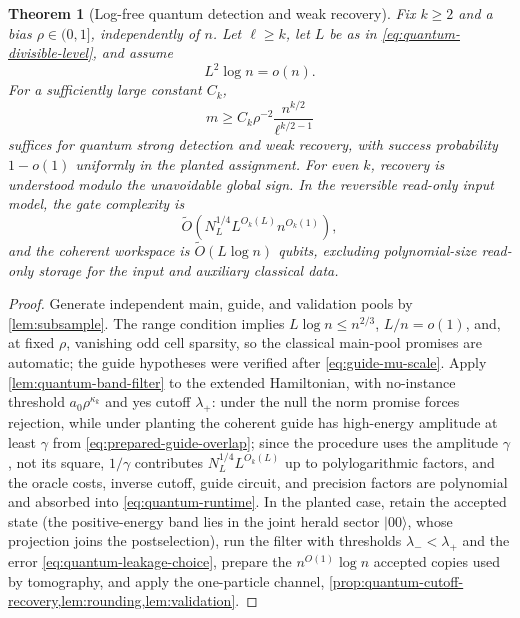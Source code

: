 \documentclass[11pt]{article}
\newtheorem{theorem}{Theorem}[section]
\theoremstyle{definition}
\theoremstyle{remark}
\newcommand{\1}{\mathbf 1}
\numberwithin{equation}{section}
\begin{document}
\begin{theorem}[Log-free quantum detection and weak recovery]
\label{thm:quantum-inference}
Fix $k\ge2$ and a bias $\rho\in(0,1]$, independently of $n$.
Let $\ell\ge k$, let $L$ be as in
\cref{eq:quantum-divisible-level}, and assume
\begin{equation}\label{eq:quantum-range}
 L^2\log n=o(n).
\end{equation}
For a sufficiently large constant $C_k$,
\begin{equation}\label{eq:quantum-sample}
 m\ge C_k\rho^{-2}
       \frac{n^{k/2}}{\ell^{k/2-1}}
\end{equation}
suffices for quantum strong detection and weak recovery, with success
probability $1-o(1)$ uniformly in the planted assignment.  For even $k$,
recovery is understood modulo the unavoidable global sign.  In the reversible
read-only input model, the gate complexity is
\begin{equation}\label{eq:quantum-runtime}
 \widetilde O\!\left(
 N_L^{1/4}L^{O_k(L)}n^{O_k(1)}
 \right),
\end{equation}
and the coherent workspace is $\widetilde O(L\log n)$ qubits, excluding
polynomial-size read-only storage for the input and auxiliary classical
data.
\end{theorem}
\begin{proof}
Generate independent main, guide, and validation pools by
\cref{lem:subsample}.  The range condition implies
$L\log n\le n^{2/3}$, $L/n=o(1)$, and, at fixed $\rho$, vanishing odd
cell sparsity, so the classical main-pool promises are automatic; the
guide hypotheses were verified after \cref{eq:guide-mu-scale}.  Apply
\cref{lem:quantum-band-filter} to the extended Hamiltonian, with
no-instance threshold $a_0\rho^{\kappa_k}$ and yes cutoff $\lambda_+$:
under the null the norm promise forces rejection, while under planting
the coherent guide has high-energy amplitude at least $\gamma$ from
\cref{eq:prepared-guide-overlap}; since the procedure uses the
amplitude $\gamma$, not its square, $1/\gamma$ contributes
$N_L^{1/4}L^{O_k(L)}$ up to polylogarithmic factors, and the oracle
costs, inverse cutoff, guide circuit, and precision factors are
polynomial and absorbed into \cref{eq:quantum-runtime}.  In the
planted case, retain the accepted state (the positive-energy band lies
in the joint herald sector $|00\rangle$, whose projection joins the
postselection), run the filter with thresholds $\lambda_-<\lambda_+$
and the error \cref{eq:quantum-leakage-choice}, prepare the
$n^{O(1)}\log n$ accepted copies used by tomography, and apply the
one-particle channel,
\cref{prop:quantum-cutoff-recovery,lem:rounding,lem:validation}.
\end{proof}
\end{document}
